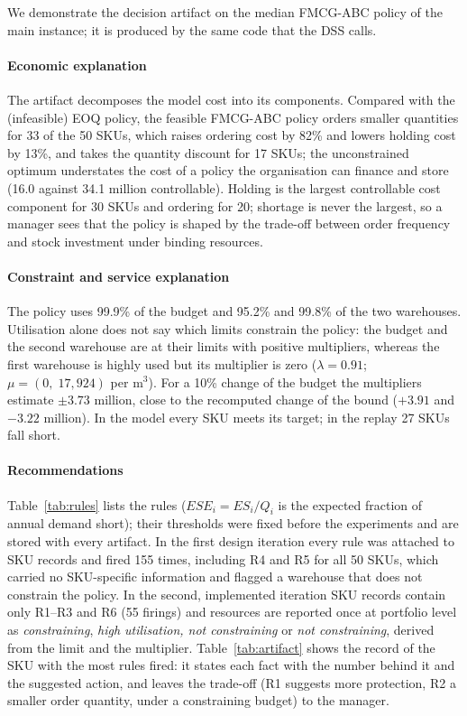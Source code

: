 We demonstrate the decision artifact on the median FMCG-ABC policy of the main instance; it is produced by the same code that the DSS calls.

\paragraph{Economic explanation} The artifact decomposes the model cost into its components. Compared with the (infeasible) EOQ policy, the feasible FMCG-ABC policy orders smaller quantities for 33 of the 50 SKUs, which raises ordering cost by 82\% and lowers holding cost by 13\%, and takes the quantity discount for 17 SKUs; the unconstrained optimum understates the cost of a policy the organisation can finance and store (16.0 against 34.1 million controllable). Holding is the largest controllable cost component for 30 SKUs and ordering for 20; shortage is never the largest, so a manager sees that the policy is shaped by the trade-off between order frequency and stock investment under binding resources.


\paragraph{Constraint and service explanation} The policy uses 99.9\% of the budget and 95.2\% and 99.8\% of the two warehouses. Utilisation alone does not say which limits constrain the policy: the budget and the second warehouse are at their limits with positive multipliers, whereas the first warehouse is highly used but its multiplier is zero ($\lambda=0.91$; $\mu=(0,\;17{,}924)$ per m$^3$). For a 10\% change of the budget the multipliers estimate $\pm3.73$ million, close to the recomputed change of the bound ($+3.91$ and $-3.22$ million). In the model every SKU meets its target; in the replay 27 SKUs fall short.


\paragraph{Recommendations} Table~\ref{tab:rules} lists the rules ($ESE_i=ES_i/Q_i$ is the expected fraction of annual demand short); their thresholds were fixed before the experiments and are stored with every artifact. In the first design iteration every rule was attached to SKU records and fired 155 times, including R4 and R5 for all 50 SKUs, which carried no SKU-specific information and flagged a warehouse that does not constrain the policy. In the second, implemented iteration SKU records contain only R1--R3 and R6 (55 firings) and resources are reported once at portfolio level as \emph{constraining}, \emph{high utilisation, not constraining} or \emph{not constraining}, derived from the limit and the multiplier. Table~\ref{tab:artifact} shows the record of the SKU with the most rules fired: it states each fact with the number behind it and the suggested action, and leaves the trade-off (R1 suggests more protection, R2 a smaller order quantity, under a constraining budget) to the manager.

